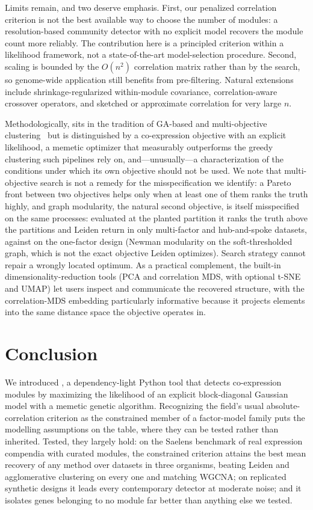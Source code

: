 Limits remain, and two deserve emphasis. First, our penalized correlation
criterion is not the best available way to choose the number of modules: a
resolution-based community detector with no explicit model recovers the module
count more reliably. The contribution here is a principled criterion within a
likelihood framework, not a state-of-the-art model-selection procedure. Second,
scaling is bounded by the $O(n^2)$ correlation matrix rather than by the search,
so genome-wide application still benefits from pre-filtering. Natural extensions
include shrinkage-regularized within-module covariance, correlation-aware
crossover operators, and sketched or approximate correlation for very large $n$.

Methodologically, \tool{} sits in the tradition of GA-based and multi-objective
clustering~\cite{Maulik2000,Handl2007} but is distinguished by a co-expression
objective with an explicit likelihood, a memetic optimizer that measurably
outperforms the greedy clustering such pipelines rely on, and---unusually---a
characterization of the conditions under which its own objective should not be
used. We note that multi-objective search is not a remedy for the
misspecification we identify: a Pareto front between two objectives helps only
when at least one of them ranks the truth highly, and graph modularity, the natural second objective, is itself misspecified on the same processes: evaluated at the planted partition it ranks the truth above the partitions \tool{} and Leiden return in only \DiagModTruthTopMultiFac{} multi-factor and \DiagModTruthTopHub{} hub-and-spoke datasets, against \DiagModTruthTopOneFac{} on the one-factor design (Newman modularity on the soft-thresholded graph, which is not the exact objective Leiden optimizes). Search strategy cannot repair a wrongly located optimum. As a
practical complement, the built-in dimensionality-reduction tools (PCA and
correlation MDS, with optional t-SNE and UMAP) let users inspect and communicate
the recovered structure, with the correlation-MDS embedding particularly
informative because it projects elements into the same distance space the
objective operates in.

\section*{Conclusion}
We introduced \tool{}, a dependency-light Python tool that detects co-expression
modules by maximizing the likelihood of an explicit block-diagonal Gaussian model
with a memetic genetic algorithm. Recognizing the field's usual
absolute-correlation criterion as the constrained member of a factor-model family
puts the modelling assumptions on the table, where they can be tested rather than
inherited. Tested, they largely hold: on the Saelens benchmark of real expression
compendia with curated modules, the constrained criterion attains the best mean
recovery of any method over \SaelensNDatasets{} datasets in three organisms,
beating Leiden and agglomerative clustering on every one and matching WGCNA; on
replicated synthetic designs it leads every contemporary detector at moderate
noise; and it isolates genes belonging to no module far better than anything else
we tested.

